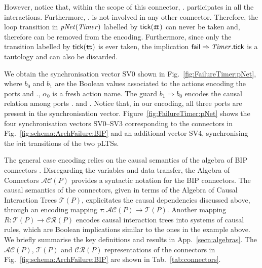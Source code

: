 \documentclass{llncs}
\newcommand{\fig}[1]{Fig.~\ref{fig:#1}}
\newcommand{\Fig}[1]{Figure~\ref{fig:#1}}
\newcommand{\tab}[1]{Tab.~\ref{tab:#1}}
\newcommand{\app}[1]{App.~\ref{secn:#1}}
\newcommand{\ndash}{--}
\newcommand{\true} {\ensuremath{\mathtt{t\!t}}}
\newcommand{\false}{\ensuremath{\mathtt{f\!f}}}
\newcommand{\init} {\ensuremath{\mathsf{init}}}
\newcommand{\ct}{\ensuremath{\mathcal{T}}}
\newcommand{\cru}{\ensuremath{\mathcal{CR}}}
\newcommand{\ac}{\ensuremath{\mathcal{AC}}}
\newcommand{\nopri}[1][]{\ensuremath{\mathit{pNet}%
    \ifx#1\relax\else(#1)\fi}}
\begin{document}
However, notice
that, within the scope of this connector, {\NameTimer.\PortTick}
participates in all the interactions.
%
Furthermore, {\NameTimer.\PortTick} is not involved in any other
connector.  Therefore, the loop transition in \nopri[\NameTimer]
labelled by $\PortTick(\false)$ can never be taken and, therefore can
be removed from the encoding.  Furthermore, since only the transition
labelled by $\PortTick(\true)$ is ever taken, 
%
the
implication $\mathsf{fail} \Rightarrow \mathit{Timer}.\mathsf{tick}$ is a tautology and can also be discarded.

We obtain the
synchronisation vector SV0 shown in \fig{FailureTimer:pNet}, where $b_0$ and
$b_1$ are the Boolean values associated to the actions encoding the
ports {\PortFail} and {\NameCtrl.\PortFail}, $\alpha_0$ is a fresh
action name.  The guard $b_1 \Rightarrow b_0$ encodes the causal
relation among ports {\NameCtrl.\PortFail} and {\PortFail}.  Notice
that, in our encoding, all three ports are present in the
synchronisation vector.  \Fig{FailureTimer:pNet} shows
the four synchronisation vectors SV0\ndash SV3 corresponding to the
connectors in \fig{schema:ArchFailure:BIP} and an additional vector
SV4, synchronising the {\init} transitions of the two pLTSs.

The general case encoding relies on the causal semantics of the
algebra of BIP connectors \cite{BliSif10-causal-fmsd}.  Disregarding
the variables and data transfer, the Algebra of Connectors $\ac(P)$
\cite{BliSif07-acp-emsoft} provides a syntactic notation for the BIP
connectors.  The causal semantics of the connectors, given in terms of
the Algebra of Causal Interaction Trees $\ct(P)$, explicitates the
causal dependencies discussed above, through an encoding mapping
$\tau: \ac(P) \rightarrow \ct(P)$.  Another mapping $R: \ct(P)
\rightarrow \cru(P)$ encodes causal interaction trees into systems of
causal rules, which are Boolean implications similar to the ones in
the example above.  We briefly summarise the key definitions and
results in \app{algebras}.  The $\ac(P)$, $\ct(P)$ and $\cru(P)$
representations of the connectors in \fig{schema:ArchFailure:BIP} are
shown in \tab{connectors}.
\end{document}
